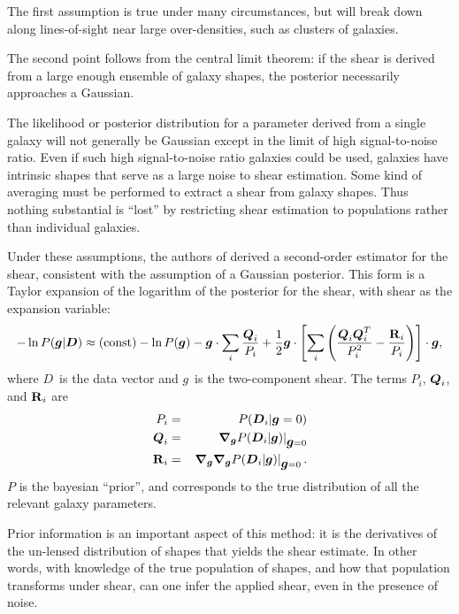 \documentclass[12pt,preprint]{aastex}
\newcommand{\vecg}{\mbox{\boldmath $g$}}
\newcommand{\vecD}{\mbox{\boldmath $D$}}
\newcommand{\vecQ}{\mbox{\boldmath $Q$}}
\newcommand{\matR}{\mbox{$\bf R$}}
\newcommand{\bnabg}{ \boldsymbol{\nabla_g}}
\begin{document}
The first assumption is true under many circumstances, but will break down
along lines-of-sight near large over-densities, such as clusters of galaxies.

The second point follows from the central limit theorem: if the shear is
derived from a large enough ensemble of galaxy shapes, the posterior
necessarily approaches a Gaussian.

The likelihood or posterior distribution for a parameter derived from a single
galaxy will not generally be Gaussian except in the limit of high
signal-to-noise ratio. Even if such high signal-to-noise ratio galaxies could
be used, galaxies have intrinsic shapes that serve as a large noise to shear
estimation. Some kind of averaging must be performed to extract a shear from
galaxy shapes.  Thus nothing substantial is ``lost'' by restricting shear
estimation to populations rather than individual galaxies.  

Under these assumptions, the authors of \cite{ba14} derived a second-order
estimator for the shear, consistent with the assumption of a Gaussian
posterior.  This form is a Taylor expansion of the logarithm of the posterior
for the shear, with shear as the expansion variable:
\begin{equation} \label{eq:pexpand}
-\ln P(\vecg | \vecD) \approx {(\rm const)} - \ln P(\vecg) - \vecg \cdot \sum_i
    \frac{\vecQ_i}{P_i}
    + \frac{1}{2} \vecg \cdot \left[ \sum_i \left(\frac{\vecQ_i \vecQ^T_i}{P_i^2}
    - \frac{\matR_i}{P_i}\right) \right] \cdot \vecg,
\end{equation}
where \vecD\ is the data vector and \vecg\ is the two-component shear.  The
terms $P_i$, $\vecQ_i$, and $\matR_i$ are 
\begin{eqnarray} \label{eq:pqrdef}
P_i     & = & P(\vecD_i | \vecg=0) \nonumber \\
\vecQ_i & = & \left. \bnabg P(\vecD_i | \vecg)\right|_{\vecg=0} \\
\matR_i & = & \left. \bnabg \bnabg P(\vecD_i | \vecg)\right|_{\vecg=0}. \nonumber
\end{eqnarray}
$P$ is the bayesian ``prior'', and corresponds to the true distribution
of all the relevant galaxy parameters.

Prior information is an important aspect of this method: it is the derivatives
of the un-lensed distribution of shapes that yields the shear estimate.  In
other words, with knowledge of the true population of shapes, and how that
population transforms under shear, can one infer the applied shear, even in the
presence of noise.
\end{document}
